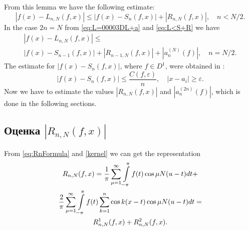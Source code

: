From this lemma we have the following estimate:
\begin{equation}
|f(x) - L_{n,N}(f,x)|\leq|f(x)-S_{n}(f,x)|+|R_{n,N}(f,x)|, \quad n < N/2.\label{eq:L<S+R}
\end{equation}
In the case $2n=N$ from \eqref{eq:L=00003DL+a} and \eqref{eq:L<S+R} we have
\begin{multline}\label{eq:L<S+R+a}
|f(x)-L_{n,N}(f,x)| \leq\\
|f(x)-S_{n-1}(f,x)|+|R_{n-1,N}(f,x)|+|a_{n}^{(N)}(f)|,\quad n=N/2.
\end{multline}
The estimate for $|f(x)-S_{n}(f,x)|$, where $f \in D^1$, were obtained in \cite{mkasumov_disc_funcs}:
\begin{equation} \label{f_Sn_estimate_}
|f(x)-S_{n}(f,x)| \leq \frac{C(f,\varepsilon)}{n},\quad |x - a_i| \geq \varepsilon.
\end{equation}
Now we have to estimate the values $|R_{n,N}(f,x)|$ and $|a_{n}^{(2n)}(f)|$, which is done in the following sections.

\subsection{Оценка $|R_{n,N}(f,x)|$}
From \eqref{eq:RnFormula} and \eqref{kernel} we can get the representation
\begin{multline*}
R_{n,N}(f,x)=\frac{1}{\pi}\sum_{\mu=1}^{\infty}\intop_{-\pi}^{\pi}f(t)\cos\mu N(u-t)dt+\\
\frac{2}{\pi}\sum_{\mu=1}^{\infty}\intop_{-\pi}^{\pi}f(t)\sum_{k=1}^{n}\cos k(x-t) \cos \mu N(u-t)dt=\\
R_{n,N}^{1}(f,x)+R_{n,N}^{2}(f,x).
\end{multline*}

